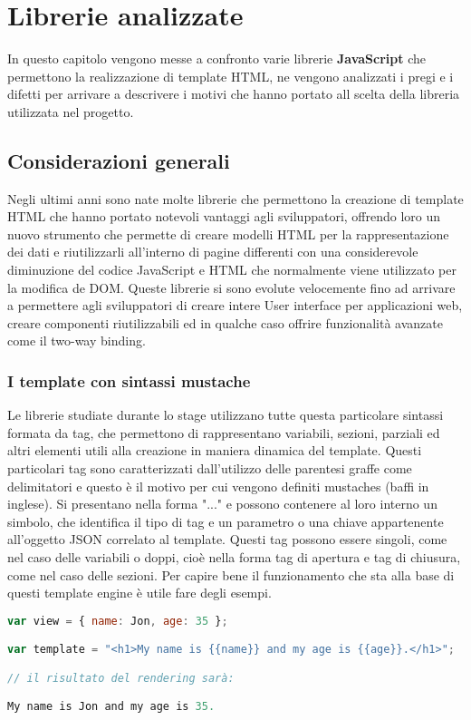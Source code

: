 
\chapter{Librerie analizzate}
\label{cap:librerie-analizzate}
In questo capitolo vengono messe a confronto varie librerie \textbf{JavaScript} che permettono la realizzazione di template HTML, ne vengono analizzati i pregi e i difetti per arrivare a descrivere i motivi che hanno portato all scelta della libreria utilizzata nel progetto.

\section{Considerazioni generali}
Negli ultimi anni sono nate molte librerie che permettono la creazione di template HTML che hanno portato notevoli vantaggi agli sviluppatori, offrendo loro un nuovo strumento che permette di creare modelli HTML per la rappresentazione dei dati e riutilizzarli all'interno di pagine differenti con una considerevole diminuzione del codice JavaScript e HTML che normalmente viene utilizzato per la modifica de DOM.
Queste librerie si sono evolute velocemente fino ad arrivare a permettere agli sviluppatori di creare intere User interface per applicazioni web, creare componenti riutilizzabili ed in qualche caso offrire funzionalità avanzate come il two-way binding.

\subsection{I template con sintassi mustache}
Le librerie studiate durante lo stage utilizzano tutte questa particolare sintassi formata da tag, che permettono di rappresentano variabili, sezioni, parziali ed altri elementi utili alla creazione in maniera dinamica del template.
Questi particolari tag sono caratterizzati dall'utilizzo delle parentesi graffe come delimitatori e questo è il motivo per cui vengono definiti mustaches (baffi in inglese).
Si presentano nella forma "{{...}}" e possono contenere al loro interno un simbolo, che identifica il tipo di tag e un parametro o una chiave appartenente all'oggetto JSON correlato al template.
Questi tag possono essere singoli, come nel caso delle variabili o doppi, cioè nella forma tag di apertura e tag di chiusura, come nel caso delle sezioni.
Per capire bene il funzionamento che sta alla base di questi template engine è utile fare degli esempi.
\begin{lstlisting}[language=JavaScript, caption=Esempio di template rappresentante una variabile.]
var view = { name: Jon,	age: 35	};

var template = "<h1>My name is {{name}} and my age is {{age}}.</h1>";

// il risultato del rendering sarà:

My name is Jon and my age is 35.
\end{lstlisting}

